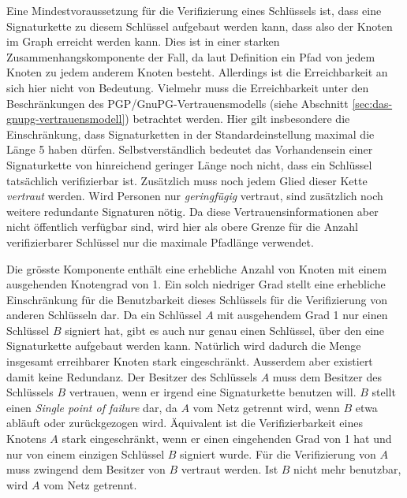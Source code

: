 Eine Mindestvoraussetzung f\"ur die Verifizierung eines Schl\"ussels
ist, dass eine Signaturkette zu diesem Schl\"ussel aufgebaut werden
kann, dass also der Knoten im Graph erreicht werden kann. Dies ist in
einer starken Zusammenhangskomponente der Fall, da laut Definition ein
Pfad von jedem Knoten zu jedem anderem Knoten besteht. Allerdings ist
die Erreichbarkeit an sich hier nicht von Bedeutung. Vielmehr muss die
Erreichbarkeit unter den Beschr\"ankungen des
PGP/GnuPG-Vertrauensmodells (siehe Abschnitt
\ref{sec:das-gnupg-vertrauensmodell}) betrachtet werden. Hier gilt
insbesondere die Einschr\"ankung, dass Signaturketten in der
Standardeinstellung maximal die L\"ange 5 haben
d\"urfen. Selbstverst\"andlich bedeutet das Vorhandensein einer
Signaturkette von hinreichend geringer L\"ange noch nicht, dass ein
Schl\"ussel tats\"achlich verifizierbar ist. Zus\"atzlich muss noch
jedem Glied dieser Kette \emph{vertraut} werden. Wird Personen nur
\emph{geringf\"ugig} vertraut, sind zus\"atzlich noch weitere
redundante Signaturen n\"otig. Da diese Vertrauensinformationen aber
nicht \"offentlich verf\"ugbar sind, wird hier als obere Grenze f\"ur
die Anzahl verifizierbarer Schl\"ussel nur die maximale Pfadl\"ange
verwendet.

Die gr\"osste Komponente enth\"alt eine erhebliche Anzahl von Knoten
mit einem ausgehenden Knotengrad von 1. Ein solch niedriger Grad
stellt eine erhebliche Einschr\"ankung f\"ur die Benutzbarkeit dieses
Schl\"ussels f\"ur die Verifizierung von anderen Schl\"usseln dar. Da
ein Schl\"ussel $A$ mit ausgehendem Grad 1 nur einen Schl\"ussel $B$
signiert hat, gibt es auch nur genau einen Schl\"ussel, \"uber den
eine Signaturkette aufgebaut werden kann. Nat\"urlich wird dadurch die
Menge insgesamt erreihbarer Knoten stark eingeschr\"ankt. Ausserdem
aber existiert damit keine Redundanz. Der Besitzer des Schl\"ussels
$A$ muss dem Besitzer des Schl\"ussels $B$ vertrauen, wenn er irgend
eine Signaturkette benutzen will. $B$ stellt einen \emph{Single point
  of failure} dar, da $A$ vom Netz getrennt wird, wenn $B$ etwa
abl\"auft oder zur\"uckgezogen wird. \"Aquivalent ist die
Verifizierbarkeit eines Knotens $A$ stark eingeschr\"ankt, wenn er
einen eingehenden Grad von 1 hat und nur von einem einzigen
Schl\"ussel $B$ signiert wurde. F\"ur die Verifizierung von $A$ muss
zwingend dem Besitzer von $B$ vertraut werden. Ist $B$ nicht mehr
benutzbar, wird $A$ vom Netz getrennt.

